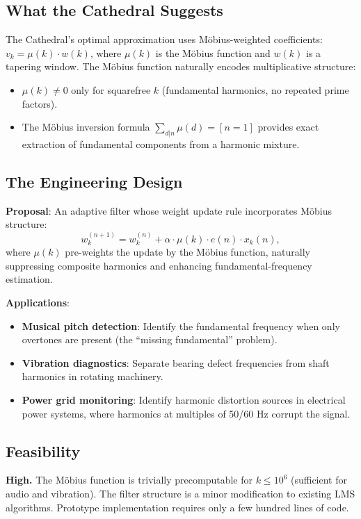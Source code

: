 \documentclass[11pt,a4paper]{article}
\begin{document}
\subsection{What the Cathedral Suggests}

The Cathedral's optimal approximation uses M\"obius-weighted
coefficients: $v_k = \mu(k) \cdot w(k)$, where $\mu(k)$ is the
M\"obius function and $w(k)$ is a tapering window. The M\"obius
function naturally encodes multiplicative structure:
\begin{itemize}
  \item $\mu(k) \neq 0$ only for squarefree $k$ (fundamental
    harmonics, no repeated prime factors).
  \item The M\"obius inversion formula $\sum_{d|n} \mu(d) = [n=1]$
    provides exact extraction of fundamental components from a
    harmonic mixture.
\end{itemize}

\subsection{The Engineering Design}

\textbf{Proposal}: An adaptive filter whose weight update rule
incorporates M\"obius structure:
\[
  w_k^{(n+1)} = w_k^{(n)} + \alpha \cdot \mu(k) \cdot e(n) \cdot
  x_k(n),
\]
where $\mu(k)$ pre-weights the update by the M\"obius function,
naturally suppressing composite harmonics and enhancing
fundamental-frequency estimation.

\textbf{Applications}:
\begin{itemize}
  \item \textbf{Musical pitch detection}: Identify the fundamental
    frequency when only overtones are present (the ``missing
    fundamental'' problem).
  \item \textbf{Vibration diagnostics}: Separate bearing defect
    frequencies from shaft harmonics in rotating machinery.
  \item \textbf{Power grid monitoring}: Identify harmonic distortion
    sources in electrical power systems, where harmonics at
    multiples of 50/60 Hz corrupt the signal.
\end{itemize}

\subsection{Feasibility}

\textbf{High.} The M\"obius function is trivially precomputable for
$k \leq 10^6$ (sufficient for audio and vibration). The filter
structure is a minor modification to existing LMS algorithms.
Prototype implementation requires only a few hundred lines of code.
\end{document}
